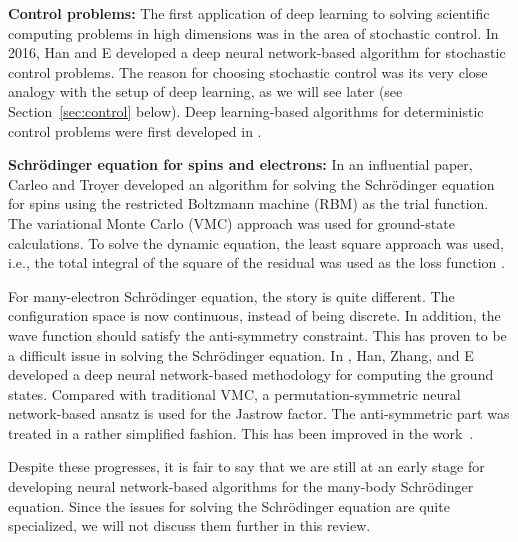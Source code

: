 \documentclass[12pt,AutoFakeBold,AutoFakeSlant]{article}
\theoremstyle{definition}
\begin{document}
	\vspace{.1in}
	\noindent
	{\bf Control problems:}
		The first application of deep learning to solving scientific computing problems in high dimensions was in the area of
		stochastic control.  In 2016, Han and E \cite{HanE2016deepcontrol} developed  a deep neural network-based algorithm for stochastic control problems.
		The reason for choosing stochastic control  was its very close analogy with the setup of deep learning, 
		as we will see later (see Section~\ref{sec:control} below).
		Deep learning-based algorithms for deterministic control problems were first developed in
		\cite{nakamura2019adaptive}.
		

	\vspace{.1in}
	\noindent
	{\bf Schr\"odinger equation for spins and electrons:}
	In an influential paper, Carleo and Troyer  developed an algorithm for solving the Schr\"odinger
	equation for spins using the restricted Boltzmann machine (RBM) as the trial function.
	The variational Monte Carlo (VMC) approach was used for ground-state calculations.  To solve the dynamic equation,
	the  least square approach was used, i.e., the total integral of the square of the residual was used as the loss function \cite{carleo2017solving}.
	
	For many-electron Schr\"odinger equation, the story is quite different. The configuration space is now continuous, instead of being discrete.
	In addition, the wave function should satisfy the anti-symmetry constraint. This has proven to be a difficult issue in solving the 
	Schr\"odinger equation.
	In \cite{han2019solving}, Han, Zhang, and E  developed a deep neural network-based methodology for computing the ground states.
	Compared with traditional VMC, a permutation-symmetric neural network-based ansatz is used for the Jastrow factor. The
	anti-symmetric part was treated in a rather simplified fashion. This has been improved in the work~\cite{luo2019backflow, pfau2019ab, Hermann2019deep}. 
	
	Despite these progresses, it is fair to say that we are still at an early
	stage for developing  neural network-based algorithms for the many-body Schr\"odinger equation.
	Since the issues for solving the Schr\"odinger equation are quite specialized,  we will not discuss them further in this review.
		
\end{document}
